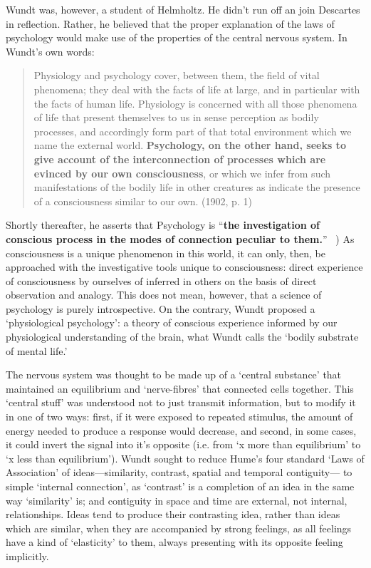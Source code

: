 \begin{refsection}
Wundt was, however, a student of Helmholtz. He didn't run off an join Descartes in reflection. Rather, he believed that the proper explanation of the laws of psychology would make use of the properties of the central nervous system. In Wundt's own words:

\begin{quote}

Physiology and psychology cover, between them, the field of vital phenomena; they deal with the facts of life at large, and in particular with the facts of human life. Physiology is concerned with all those phenomena of life that present themselves to us in sense perception as bodily processes, and accordingly form part of that total environment which we name the external world. \textbf{Psychology, on the other hand, seeks to give account of the interconnection of processes which are evinced by our own consciousness}, or which we infer from such manifestations of the bodily life in other creatures as indicate the presence of a consciousness similar to our own. (1902, p. 1)
\end{quote}

Shortly thereafter, he asserts that Psychology is ``\textbf{the investigation of conscious process in the modes of connection peculiar to them.}'' ~\citep[p. 2]{Wundt:1902vf}) As consciousness is a unique phenomenon in this world, it can only, then, be approached with the investigative tools unique to consciousness: direct experience of consciousness by ourselves of inferred in others on the basis of direct observation and analogy. This does not mean, however, that a science of psychology is purely introspective. On the contrary, Wundt proposed a `physiological psychology': a theory of conscious experience informed by our physiological understanding of the brain, what Wundt calls the `bodily substrate of mental life.'

The nervous system was thought to be made up of a `central substance' that maintained an equilibrium and `nerve-fibres' that connected cells together. This `central stuff' was understood not to just transmit information, but to modify it in one of two ways: first, if it were exposed to repeated stimulus, the amount of energy needed to produce a response would decrease, and second, in some cases, it could invert the signal into it's opposite (i.e. from `x more than equilibrium' to `x less than equilibrium'). Wundt sought to reduce Hume's four standard `Laws of Association' of ideas---similarity, contrast, spatial and temporal contiguity--- to simple `internal connection', as `contrast' is a completion of an idea in the same way `similarity' is; and contiguity in space and time are external, not internal, relationships. Ideas tend to produce their contrasting idea, rather than ideas which are similar, when they are accompanied by strong feelings, as all feelings have a kind of `elasticity' to them, always presenting with its opposite feeling implicitly.


\end{refsection}

